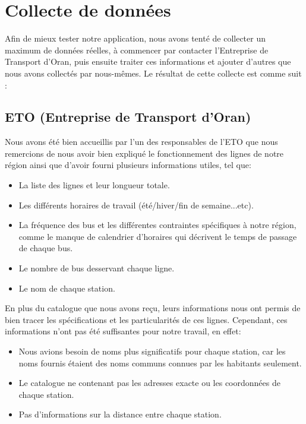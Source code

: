 \section{Collecte de données}
Afin de mieux tester notre application, nous avons tenté de collecter un maximum de données réelles, à commencer par contacter l'Entreprise de Transport d'Oran, puis ensuite traiter ces informations et ajouter d'autres que nous avons collectés par nous-mêmes.
Le résultat de cette collecte est comme suit :

\subsection{ETO (Entreprise de Transport d'Oran)}

Nous avons été bien accueillis par l'un des responsables de l'ETO que nous remercions de nous avoir bien expliqué le fonctionnement des lignes de notre région ainsi que d'avoir fourni plusieurs informations utiles, tel que:
\begin{itemize}
	\item La liste des lignes et leur longueur totale.
	\item Les différents horaires de travail (été/hiver/fin de semaine...etc).
	\item La fréquence des bus et les différentes contraintes spécifiques à notre région, comme le manque de calendrier d'horaires qui décrivent le temps de passage de chaque bus.
	\item Le nombre de bus desservant chaque ligne.
	\item Le nom de chaque station.
\end{itemize}

En plus du catalogue que nous avons reçu, leurs informations nous ont permis de bien tracer les spécifications et les particularités de ces lignes.
Cependant, ces informations n'ont pas été suffisantes pour notre travail, en effet:
	\begin{itemize}
	\item Nous avions besoin de noms plus significatifs pour chaque station, car les noms fournis étaient des noms communs connues par les habitants seulement.
	\item Le catalogue ne contenant pas les adresses exacte ou les coordonnées de chaque station.
	\item Pas d'informations sur la distance entre chaque station.
	\end{itemize}
	
